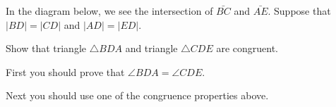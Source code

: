 \documentclass[noauthor,nooutcomes,12pt,hints,handout,newpage]{ximera}
\begin{document}
\begin{problem}\label{18} 
  In the diagram below, we see the intersection of $\bar{BC}$ and
  $\bar{AE}$. Suppose that $\left\vert BD\right\vert =\left\vert
  CD\right\vert $ and $\left\vert AD\right\vert =\left\vert
  ED\right\vert $.
  \begin{image}
  \end{image}

  
  Show that triangle $\triangle BDA$ and triangle $\triangle CDE$ are
  congruent.

  \begin{hint}
    First you should prove that  $\angle BDA = \angle CDE$.
  \end{hint}
  \begin{hint}
    Next you should use one of the congruence properties above. 
  \end{hint}
        
        
        
        

\end{problem}
\end{document}
